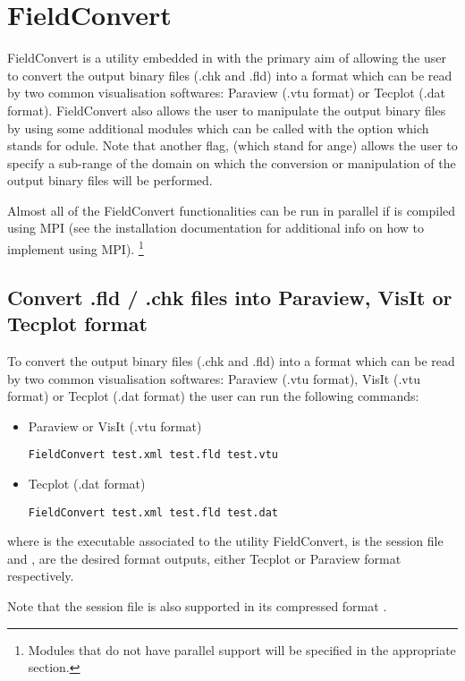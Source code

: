 \chapter{FieldConvert}
\label{s:utilities:fieldconvert}
FieldConvert is a utility embedded in \nekpp with the primary 
aim of allowing the user to convert the \nekpp output binary files 
(.chk and .fld) into a format which can be read by two common 
visualisation softwares: Paraview (.vtu format) or Tecplot (.dat 
format). FieldConvert also allows the user to manipulate the 
\nekpp output binary files by using some additional modules 
which can be called with the option  which stands 
for odule. Note that another flag,  (which stand for 
ange) allows the user to specify a sub-range of the domain 
on which the conversion or manipulation of the \nekpp output binary
files will be performed. 

Almost all of the FieldConvert functionalities can be run in parallel if \nekpp
is compiled using MPI (see the installation documentation for additional info on
how to implement \nekpp using MPI). \footnote{Modules that do not have parallel
  support will be specified in the appropriate section.}
%
%
%
\section{Convert .fld / .chk files into Paraview, VisIt or Tecplot format}
\label{s:utilities:fieldconvert:sub:convert}
To convert the \nekpp output binary files (.chk and .fld) into a
format which can be read by two common visualisation softwares:
Paraview (.vtu format), VisIt (.vtu format) or Tecplot (.dat format)
the user can run the following commands:
%
\begin{itemize}
\item Paraview or VisIt (.vtu format)
%
\begin{lstlisting}[style=BashInputStyle]
FieldConvert test.xml test.fld test.vtu
\end{lstlisting}
%
\item Tecplot (.dat format)
%
\begin{lstlisting}[style=BashInputStyle]
FieldConvert test.xml test.fld test.dat
\end{lstlisting}
%
\end{itemize}
%
where  is the executable associated to the utility 
FieldConvert,  is the session file and , 
 are the desired format outputs, either Tecplot or 
Paraview format respectively. 
%
\begin{tipbox}
Note that the session file is also supported 
in its compressed format .
\end{tipbox}
%
%
%
